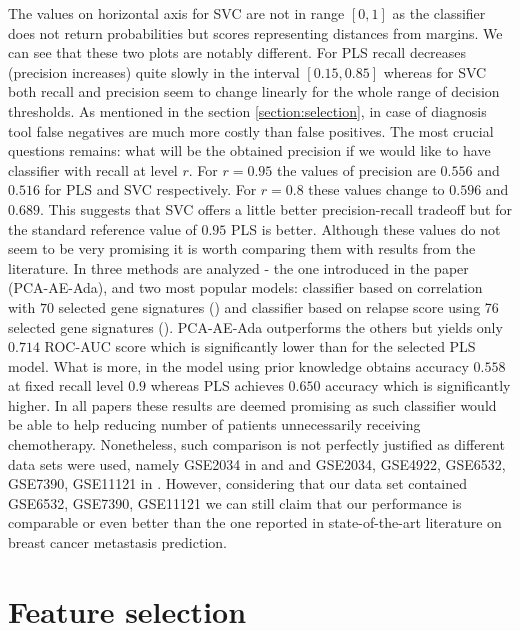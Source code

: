 \documentclass[shortabstract, english, mgr]{iithesis}
\begin{document}
The values on horizontal axis for SVC are not in range $[0, 1]$ as the classifier does not return probabilities but scores representing distances from margins. We can see that these two plots are notably different. For PLS recall decreases (precision increases) quite slowly in the interval $[0.15, 0.85]$ whereas for SVC both recall and precision seem to change linearly for the whole range of decision thresholds. As mentioned in the section \ref{section:selection}, in case of diagnosis tool false negatives are much more costly than false positives. The most crucial questions remains: what will be the obtained precision if we would like to have classifier with recall at level $r$. For $r=0.95$ the values of precision are $0.556$ and $0.516$ for PLS and SVC respectively. For $r=0.8$ these values change to $0.596$ and $0.689$. This suggests that SVC offers a little better precision-recall tradeoff but for the standard reference value of $0.95$ PLS is better. Although these values do not seem to be very promising it is worth comparing them with results from the literature. In \cite{MetastasisComparison} three methods are analyzed - the one introduced in the paper (PCA-AE-Ada), and two most popular models: classifier based on correlation with $70$ selected gene signatures (\cite{Metastasis1}) and classifier based on relapse score using 76 selected gene signatures (\cite{metastasis76}). PCA-AE-Ada outperforms the others but yields only $0.714$ ROC-AUC score which is significantly lower than for the selected PLS model. What is more, in \cite{MetastasisScores} the model using prior knowledge obtains accuracy $0.558$ at fixed recall level $0.9$ whereas PLS achieves $0.650$ accuracy which is significantly higher. In all papers these results are deemed promising as such classifier would be able to help reducing number of patients unnecessarily receiving chemotherapy. Nonetheless, such comparison is not perfectly justified as different data sets were used, namely GSE2034 in \cite{MetastasisScores} and \cite{metastasis76} and GSE2034, GSE4922, GSE6532, GSE7390, GSE11121 in \cite{MetastasisComparison}. However, considering that our data set contained GSE6532, GSE7390, GSE11121 we can still claim that our performance is comparable or even better than the one reported in state-of-the-art literature on breast cancer metastasis prediction.


\section{Feature selection} \label{section:application}
\end{document}
